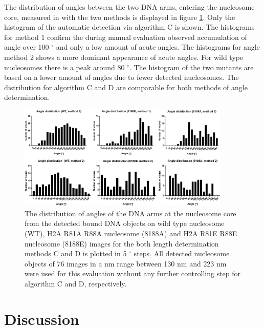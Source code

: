 \documentclass{article}
\begin{document}
The distribution of angles between the two DNA arms, entering the nucleosome core, measured in with the two methods is displayed in figure \ref{fig: hangle}. Only the histogram of the automatic detection via algorithm C is shown. The histograms for method 1 confirm the during manual evaluation observed accumulation of angle over 100 $^\circ$ and only a low amount of acute angles. The histograms for angle method 2 shows a more dominant appearance of acute angles. For wild type nucleosomes there is a peak around 80 $^\circ$. The histogram of the two mutants are based on a lower amount of angles due to fewer detected nucleosomes. The distribution for algorithm C and D are comparable for both methods of angle determination.
%
\begin{figure}[!htb]
	\begin{center}
		\includegraphics[width = 0.9\textwidth]{hangle}
	\end{center}
	\caption{The distribution of angles of the DNA arms at the nucleosome core from the detected bound DNA objects on wild type nucleosome (WT), H2A R81A R88A nucleosome (8188A) and H2A R81E R88E nucleosome (8188E) images for the both length determination methods C and D is plotted in 5 $^\circ$ steps. All detected nucleosome objects of 76 images in a nm range between 130 nm and 223 nm were used for this evaluation without any further controlling step for algorithm C and D, respectively.}
	\label{fig: hangle} %
\end{figure}

\section{Discussion}\label{sec: Discussion}
\end{document}

